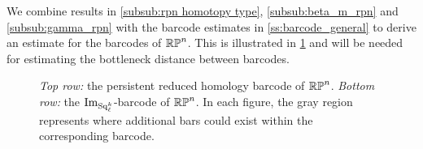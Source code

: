 We combine results in \cref{subsub:rpn homotopy type}, \cref{subsub:beta_m_rpn} and \cref{subsub:gamma_rpn} with the barcode estimates in \cref{ss:barcode_general} to derive an estimate for the barcodes of $\mathbb{RP}^n$.
This is illustrated in \cref{fig:sq barcodes} and will be needed for estimating the bottleneck distance between barcodes.

\begin{figure}
	\centering
	
	\caption{\emph{Top row:} the persistent reduced homology barcode of $\mathbb{RP}^n$.
		\emph{Bottom row:} the $\operatorname{Im}_{\operatorname{Sq}_\ell^k}$-barcode of $\mathbb{RP}^n$.
        In each figure, the gray region represents where additional bars could exist within the corresponding barcode.
	}
	\label{fig:sq barcodes}
\end{figure}

